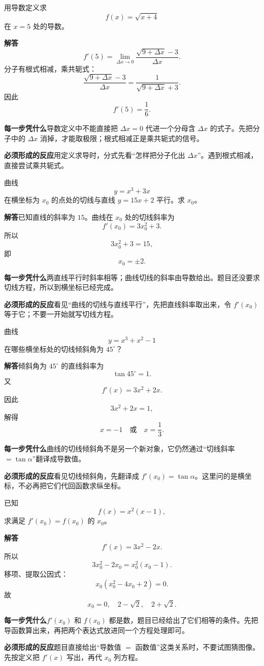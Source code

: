 \documentclass[11pt,fontset=fandol]{ctexart}
\newcommand{\answer}{\par\textbf{解答}\quad}
\newcommand{\basis}{\par\textbf{每一步凭什么}\quad}
\newcommand{\reaction}{\par\textbf{必须形成的反应}\quad}
\newenvironment{drill}[2]{
  \begin{tcolorbox}[colback=white,colframe=black!35,title={#1\quad\small #2},breakable]
}{\end{tcolorbox}}
\begin{document}
\begin{drill}{13. 定义求导时，先把分子化出增量}{甲种本《微积分初步》导数习题改编}
用导数定义求
\[
f(x)=\sqrt{x+4}
\]
在 $x=5$ 处的导数。

\answer
\[
f'(5)=\lim_{\Delta x\to0}\frac{\sqrt{9+\Delta x}-3}{\Delta x}.
\]
分子有根式相减，乘共轭式：
\[
\frac{\sqrt{9+\Delta x}-3}{\Delta x}
=\frac{1}{\sqrt{9+\Delta x}+3}.
\]
因此
\[
f'(5)=\frac16.
\]

\basis 导数定义中不能直接把 $\Delta x=0$ 代进一个分母含 $\Delta x$ 的式子。先把分子中的 $\Delta x$ 消掉，才能取极限；根式相减正是乘共轭式的信号。

\reaction 用定义求导时，分式先看“怎样把分子化出 $\Delta x$”。遇到根式相减，直接尝试乘共轭式。
\end{drill}

\begin{drill}{14. 与已知直线平行，先翻译成斜率相等}{甲种本《微积分初步》习题五改编}
曲线
\[
y=x^3+3x
\]
在横坐标为 $x_0$ 的点处的切线与直线 $y=15x+2$ 平行。求 $x_0$。

\answer 已知直线的斜率为 $15$。曲线在 $x_0$ 处的切线斜率为
\[
f'(x_0)=3x_0^2+3.
\]
所以
\[
3x_0^2+3=15,
\]
即
\[
x_0=\pm2.
\]

\basis 两直线平行时斜率相等；曲线切线的斜率由导数给出。题目还没要求切线方程，所以到横坐标已经完成。

\reaction 看见“曲线的切线与直线平行”，先把直线斜率取出来，令 $f'(x_0)$ 等于它；不要一开始就写切线方程。
\end{drill}

\begin{drill}{15. 切线倾斜角也只是一个斜率条件}{甲种本《微积分初步》习题五改编}
曲线
\[
y=x^3+x^2-1
\]
在哪些横坐标处的切线倾斜角为 $45^\circ$？

\answer 倾斜角为 $45^\circ$ 的直线斜率为
\[
\tan45^\circ=1.
\]
又
\[
f'(x)=3x^2+2x.
\]
因此
\[
3x^2+2x=1,
\]
解得
\[
x=-1\quad\text{或}\quad x=\frac13.
\]

\basis 曲线的切线倾斜角不是另一个新对象，它仍然通过“切线斜率 $=\tan\alpha$”翻译成导数值。

\reaction 看见切线倾斜角，先翻译成 $f'(x_0)=\tan\alpha$。这里问的是横坐标，不必再把它们代回函数求纵坐标。
\end{drill}

\begin{drill}{16. $f'(x_0)=f(x_0)$ 是一条可以直接展开的方程}{甲种本《微积分初步》习题五改编}
已知
\[
f(x)=x^2(x-1),
\]
求满足 $f'(x_0)=f(x_0)$ 的 $x_0$。

\answer
\[
f'(x)=3x^2-2x.
\]
所以
\[
3x_0^2-2x_0=x_0^2(x_0-1).
\]
移项、提取公因式：
\[
x_0(x_0^2-4x_0+2)=0.
\]
故
\[
x_0=0,\quad 2-\sqrt2,\quad 2+\sqrt2.
\]

\basis $f'(x_0)$ 和 $f(x_0)$ 都是数，题目已经给出了它们相等的条件。先把导函数算出来，再把两个表达式放进同一个方程处理即可。

\reaction 题目直接给出“导数值 $=$ 函数值”这类关系时，不要试图猜图像。先按定义把 $f'(x)$ 写出，再代 $x_0$ 列方程。
\end{drill}
\end{document}
